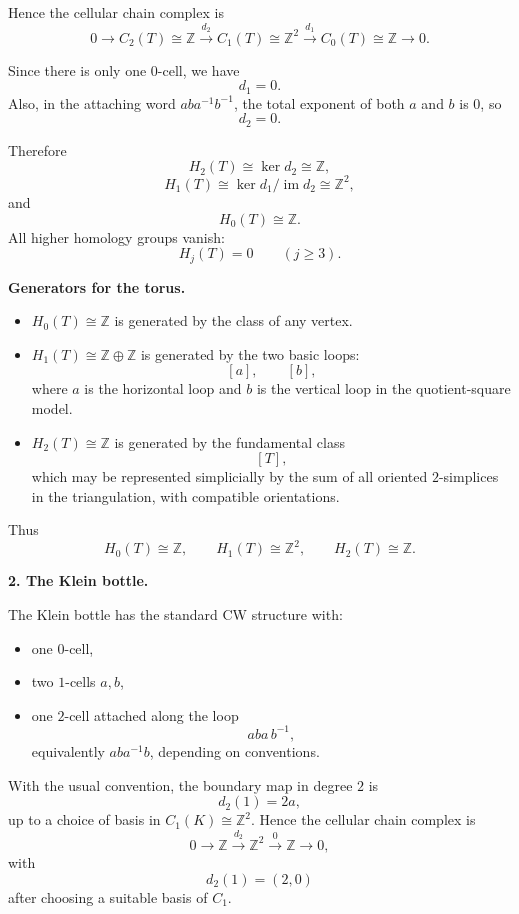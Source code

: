 \documentclass[12pt,a4paper]{article}
\theoremstyle{notespace}
\begin{document}
Hence the cellular chain complex is
\[
0 \longrightarrow C_2(T)\cong \mathbb Z
\xrightarrow{d_2}
C_1(T)\cong \mathbb Z^2
\xrightarrow{d_1}
C_0(T)\cong \mathbb Z
\longrightarrow 0.
\]

Since there is only one \(0\)-cell, we have
\[
d_1=0.
\]
Also, in the attaching word \(aba^{-1}b^{-1}\), the total exponent of both \(a\) and \(b\) is \(0\), so
\[
d_2=0.
\]

Therefore
\[
H_2(T)\cong \ker d_2 \cong \mathbb Z,
\]
\[
H_1(T)\cong \ker d_1/\operatorname{im} d_2 \cong \mathbb Z^2,
\]
and
\[
H_0(T)\cong \mathbb Z.
\]
All higher homology groups vanish:
\[
H_j(T)=0 \qquad (j\ge 3).
\]

\medskip

\textbf{Generators for the torus.}

\begin{itemize}
	\item \(H_0(T)\cong \mathbb Z\) is generated by the class of any vertex.
	\item \(H_1(T)\cong \mathbb Z\oplus \mathbb Z\) is generated by the two basic loops:
	\[
	[a],\qquad [b],
	\]
	where \(a\) is the horizontal loop and \(b\) is the vertical loop in the quotient-square model.
	\item \(H_2(T)\cong \mathbb Z\) is generated by the fundamental class
	\[
	[T],
	\]
	which may be represented simplicially by the sum of all oriented \(2\)-simplices in the triangulation, with compatible orientations.
\end{itemize}

Thus
\[
H_0(T)\cong \mathbb Z,\qquad
H_1(T)\cong \mathbb Z^2,\qquad
H_2(T)\cong \mathbb Z.
\]

\bigskip

\textbf{2. The Klein bottle.}

The Klein bottle has the standard CW structure with:

\begin{itemize}
	\item one \(0\)-cell,
	\item two \(1\)-cells \(a,b\),
	\item one \(2\)-cell attached along the loop
	\[
	aba\,b^{-1},
	\]
	equivalently \(aba^{-1}b\), depending on conventions.
\end{itemize}

With the usual convention, the boundary map in degree \(2\) is
\[
d_2(1)=2a,
\]
up to a choice of basis in \(C_1(K)\cong \mathbb Z^2\). Hence the cellular chain complex is
\[
0 \longrightarrow \mathbb Z
\xrightarrow{d_2}
\mathbb Z^2
\xrightarrow{0}
\mathbb Z
\longrightarrow 0,
\]
with
\[
d_2(1)=(2,0)
\]
after choosing a suitable basis of \(C_1\).
\end{document}
